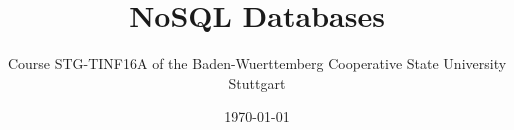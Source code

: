 \documentclass[
  12pt,
  a4paper,
  parskip,
  openany
]{scrbook}
\title{NoSQL Databases}
\author{Course STG-TINF16A of the Baden-Wuerttemberg Cooperative State University Stuttgart}
\date{\today}
\begin{document}
\maketitle
\tableofcontents


\printglossaries















\printbibliography

\appendix


\end{document}

